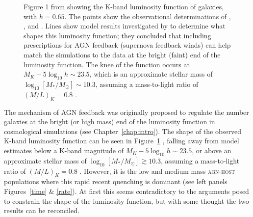  \begin{figure}
\caption[Galaxy luminosity function from observations and simulations: Figure 1 of \cite{benson03}]{Figure 1 from \cite{benson03} showing the K-band luminosity function of galaxies, with $h=0.65$. The points show the observational determinations of \citet[][circles]{cole01}, \citet[][squares]{kochanek01}, and \citet[][$z < 0.1$, asterisk]{huang03}. Lines show model results investigated by \cite{benson03} to determine what shapes this luminosity function; they concluded that including prescriptions for AGN feedback (supernova feedback winds) can help match the simulations to the data at the bright (faint) end of the luminosity function. The knee of the function occurs at $M_K -5\log_{10} h \sim 23.5$, which is an approximate stellar mass of $\log_{10}[M_*/M_{\odot}] \sim 10.3$, assuming a mass-to-light ratio of $(M/L)_K = 0.8$ \citep{brinchmann00}.}
\label{lumfunc}
\end{figure}

The mechanism of AGN feedback was originally proposed to regulate the number galaxies at the bright (or high mass) end of the luminosity function in cosmological simulations (see Chapter~\ref{chap:intro}). The shape of the observed K-band luminosity function can be seen in Figure~\ref{lumfunc} \citep[Figure 1 from][]{benson03}, falling away from model estimates below a K-band magnitude of $M_K -5\log_{10} h \sim 23.5$, or above an approximate stellar mass of $\log_{10}[M_*/M_{\odot}] \gtrsim 10.3$, assuming a mass-to-light ratio of $(M/L)_K = 0.8$ \citep{brinchmann00}. However, it is the low and medium mass \textsc{agn-host} populations where this rapid recent quenching is dominant (see left panels Figures~\ref{time} \& \ref{rate}). At first this seems contradictory to the arguments posed to constrain the shape of the luminosity function, but with some thought the two results can be reconciled. 

